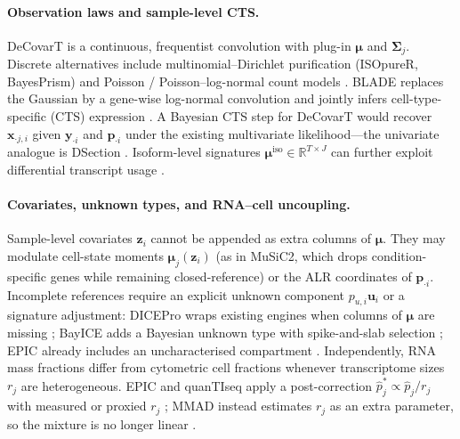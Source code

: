 \documentclass[pdflatex, sn-nature]{sn-jnl}
\theoremstyle{thmstyleone}%
\theoremstyle{thmstyletwo}%
\theoremstyle{thmstylethree}%
\begin{document}
    \paragraph{Observation laws and sample-level CTS.}
    DeCovarT is a continuous, frequentist convolution with plug-in
    $\boldsymbol{\mu}$ and $\boldsymbol{\Sigma}_{j}$. Discrete alternatives include
    multinomial--Dirichlet purification (ISOpureR, BayesPrism)
    \cite{anghelISOpureRImplementationComputational2015,chuCellTypeGeneExpression2022}
    and Poisson / Poisson--log-normal count models
    \cite{chiquetPoissonLognormalModelVersatile2021}. BLADE replaces the
    Gaussian by a gene-wise log-normal convolution and jointly infers
    cell-type-specific (CTS) expression
    \cite{andrade-barbosaBayesianLogNormalDeconvolution2021}. A Bayesian CTS
    step for DeCovarT would recover $\boldsymbol{x}_{\cdot j,i}$ given
    $\boldsymbol{y}_{\cdot i}$ and $\boldsymbol{p}_{\cdot i}$ under the existing
    multivariate likelihood---the univariate analogue is DSection
    \cite{erkkilaProbabilisticAnalysisGene2010}. Isoform-level signatures
    $\boldsymbol{\mu}^{\mathrm{iso}}\in\mathbb{R}^{T\times J}$ can further
    exploit differential transcript usage
    \cite{heilingEstimatingCellTypeComposition2023}.

    \paragraph{Covariates, unknown types, and RNA--cell uncoupling.}
    Sample-level covariates $\boldsymbol{z}_{i}$ cannot be appended as extra
    columns of $\boldsymbol{\mu}$. They may modulate cell-state moments
    $\boldsymbol{\mu}_{j}(\boldsymbol{z}_{i})$ (as in MuSiC2, which drops
    condition-specific genes while remaining closed-reference)
    \cite{fanMusic2CellTypeDeconvolution2022} or the ALR coordinates of
    $\boldsymbol{p}_{\cdot i}$. Incomplete references require an explicit unknown
    component $p_{u,i}\boldsymbol{u}_{i}$ or a signature adjustment: DICEPro
    wraps existing engines when columns of $\boldsymbol{\mu}$ are missing
    \cite{baWhenLessNot2026}; BayICE adds a Bayesian unknown type with
    spike-and-slab selection \cite{taiBayiceBayesianHierarchicalModel2021};
    EPIC already includes an uncharacterised compartment
    \cite{racleSimultaneousEnumerationCancer2017}. Independently, RNA mass
    fractions differ from cytometric cell fractions whenever transcriptome
    sizes $r_{j}$ are heterogeneous. EPIC and quanTIseq apply a
    post-correction $\hat p_{j}^{\ast}\propto\hat p_{j}/r_{j}$ with measured
    or proxied $r_{j}$
    \cite{racleSimultaneousEnumerationCancer2017,finotello_etal19,luTranscriptomeSizeMatters2025};
    MMAD instead estimates $r_{j}$ as an extra parameter, so the
    mixture is no longer linear \cite{liebnerMMADMicroarrayMicrodissection2014}.
\end{document}
